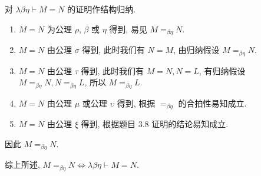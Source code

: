 \begin{solution}
对 $\lambda\beta\eta \vdash M = N$ 的证明作结构归纳.
\begin{enumerate}
\item $M = N$ 为公理 $\rho$, $\beta$ 或 $\eta$ 得到, 易见 $M =_{\beta\eta} N$.
\item $M = N$ 由公理 $\sigma$ 得到, 此时我们有 $N = M$, 由归纳假设 $M =_{\beta\eta} N$.
\item $M = N$ 由公理 $\tau$ 得到, 此时我们有 $M = N, N = L$, 有归纳假设 $M =_{\beta\eta} N, N =_{\beta\eta} L$, 所以 $M =_{\beta\eta} L$.
\item $M = N$ 由公理 $\mu$ 或公理 $\upsilon$ 得到, 根据 $=_{\beta\eta}$ 的合拍性易知成立.
\item $M = N$ 由公理 $\xi$ 得到, 根据题目 3.8 证明的结论易知成立.
\end{enumerate}
因此 $M =_{\beta\eta} N$.

综上所述, $M =_{\beta\eta} N \Leftrightarrow \lambda\beta\eta \vdash M = N$.
\end{solution}
